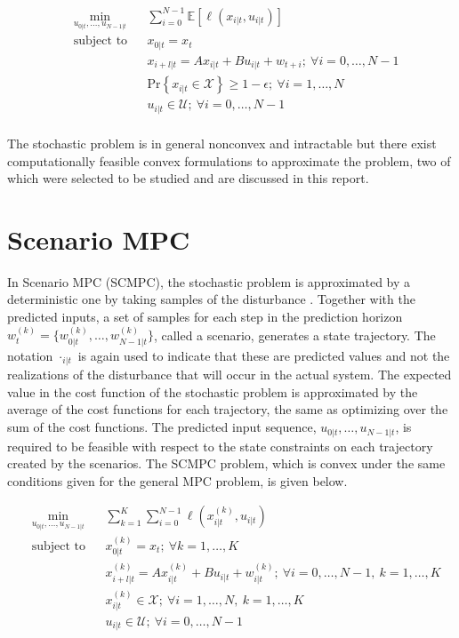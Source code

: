 \documentclass[12 pt]{report}
\begin{document}
\begin{equation*}
\begin{aligned}
& \min_{u_{0|t}, \dots, u_{N-1|t}} & & \sum_{i = 0}^{N-1} \mathbb{E} \left[ \ell (x_{i|t}, u_{i|t}) \right] \\
& \text{subject to} & & x_{0|t} = x_t \\
& & & x_{i+l|t} = Ax_{i|t} + Bu_{i|t} + w_{t+i}; ~ \forall i = 0, \dots, N-1 \\
& & & \mathrm{Pr} \left\{ x_{i|t} \in \mathcal{X}  \right\} \geq 1 - \epsilon; ~ \forall i = 1, \dots, N \\
& & & u_{i|t} \in \mathcal{U}; ~ \forall i = 0, \dots, N-1 \\
\end{aligned}
\end{equation*}

The stochastic problem is in general nonconvex and intractable but there exist computationally feasible convex formulations to approximate the problem, two of which were selected to be studied and are discussed in this report.

\section{Scenario MPC}

In Scenario MPC (SCMPC), the stochastic problem is approximated by a deterministic one by taking samples of the disturbance \cite{schildbach14}. Together with the predicted inputs, a set of samples for each step in the prediction horizon $w_t^{(k)} = \{w_{0|t}^{(k)}, \dots, w_{N-1|t}^{(k)} \} $, called a scenario, generates a state trajectory. The notation $\cdot_{i|t}$ is again used to indicate that these are predicted values and not the realizations of the disturbance that will occur in the actual system. The expected value in the cost function of the stochastic problem is approximated by the average of the cost functions for each trajectory, the same as optimizing over the sum of the cost functions. The predicted input sequence, $u_{0|t}, \dots, u_{N-1|t}$, is required to be feasible with respect to the state constraints on each trajectory created by the scenarios. The SCMPC problem, which is convex under the same conditions given for the general MPC problem, is given below.

\begin{equation*}
\begin{aligned}
& \min_{u_{0|t}, \dots, u_{N-1|t}} & & \sum_{k = 1}^{K} \sum_{i = 0}^{N-1} \ell (x_{i|t}^{(k)}, u_{i|t}) \\
& \text{subject to} & & x_{0|t}^{(k)} = x_t; ~ \forall k = 1,\dots,K \\
& & & x_{i+l|t}^{(k)} = Ax_{i|t}^{(k)} + Bu_{i|t} + w_{i|t}^{(k)}; ~ \forall i = 0, \dots, N-1, ~k = 1,\dots,K \\
& & & x_{i|t}^{(k)} \in \mathcal{X}; ~ \forall i = 1, \dots, N, ~k = 1,\dots,K \\
& & & u_{i|t} \in \mathcal{U}; ~ \forall i = 0, \dots, N-1 \\
\end{aligned}
\end{equation*}
\end{document}
